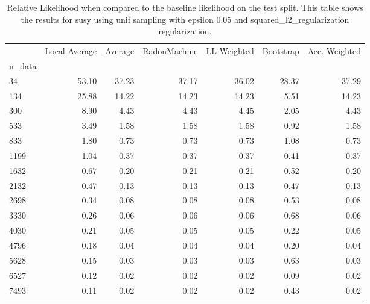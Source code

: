 \begin{table}
\centering
\caption{Relative Likelihood when compared to the baseline likelihood on the test split. This table shows the results for  susy using  unif sampling with epsilon  0.05 and  squared_l2_regularization regularization.}
\label{tab:7}
\begin{tabular}{lrrrrrr}
\toprule
{} &  Local Average &  Average &  RadonMachine &  LL-Weighted &  Bootstrap &  Acc. Weighted \\
n\_data &                &          &               &              &            &                \\
\midrule
34     &          53.10 &    37.23 &         37.17 &        36.02 &      28.37 &          37.29 \\
134    &          25.88 &    14.22 &         14.23 &        14.23 &       5.51 &          14.23 \\
300    &           8.90 &     4.43 &          4.43 &         4.45 &       2.05 &           4.43 \\
533    &           3.49 &     1.58 &          1.58 &         1.58 &       0.92 &           1.58 \\
833    &           1.80 &     0.73 &          0.73 &         0.73 &       1.08 &           0.73 \\
1199   &           1.04 &     0.37 &          0.37 &         0.37 &       0.41 &           0.37 \\
1632   &           0.67 &     0.20 &          0.21 &         0.21 &       0.52 &           0.20 \\
2132   &           0.47 &     0.13 &          0.13 &         0.13 &       0.47 &           0.13 \\
2698   &           0.34 &     0.08 &          0.08 &         0.08 &       0.53 &           0.08 \\
3330   &           0.26 &     0.06 &          0.06 &         0.06 &       0.68 &           0.06 \\
4030   &           0.21 &     0.05 &          0.05 &         0.05 &       0.22 &           0.05 \\
4796   &           0.18 &     0.04 &          0.04 &         0.04 &       0.20 &           0.04 \\
5628   &           0.15 &     0.03 &          0.03 &         0.03 &       0.63 &           0.03 \\
6527   &           0.12 &     0.02 &          0.02 &         0.02 &       0.09 &           0.02 \\
7493   &           0.11 &     0.02 &          0.02 &         0.02 &       0.43 &           0.02 \\
\bottomrule
\end{tabular}
\end{table}
